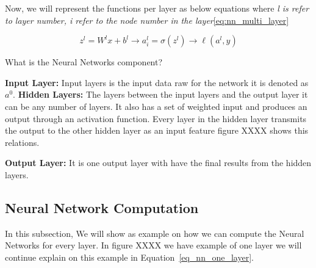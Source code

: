  Now, we will represent the functions per layer as below equations where \textit{l is refer to layer number, i refer to the node number in the layer}\eqref{eq:nn_multi_layer}
 
\begin{equation}\label{eq:nn_multi_layer}
  \boxed{z^l =  W^l x + b^l} \longrightarrow \boxed{a_i^l =  \sigma(z^l)} \longrightarrow \boxed{\ell(a^l,y)}
\end{equation}

What is the Neural Networks component?

\textbf{Input Layer:} Input layers is the input data raw for the network it is denoted as $a^0$.
\textbf{Hidden Layers:} The layers between the input layers and the output layer it can be any number of layers. It also has a set of weighted input and produces an output through an activation function. Every layer in the hidden layer transmits the output to the other hidden layer as an input feature figure XXXX shows this relations. %

\textbf{Output Layer:} It is one output layer with have the final results from the hidden layers.

 \subsection{Neural Network Computation}
 In this subsection, We will show as example on how we can compute the Neural Networks for every layer. In figure XXXX we have example of one layer we will continue explain on this example in Equation~\eqref{eq_nn_one_layer}.

